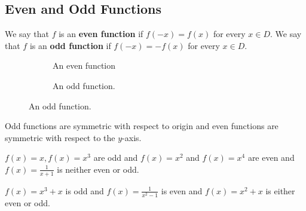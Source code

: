 \documentclass[../main.tex]{subfiles}
\begin{document}
\subsection*{Even and Odd Functions}

\begin{definition}
  We say that $f$ is an \textbf{even function} if $f\left( -x\right) =f\left( x\right) $ for every $x\in D$.
  We say that $f$ is an \textbf{odd function} if $f(-x)=-f(x)$ for every $x\in D$.
\end{definition}

\begin{figure}[H]
  \centering
  \begin{subfigure}{0.3\textwidth}
    
    \caption{An even function}
  \end{subfigure}
  \begin{subfigure}{0.3\textwidth}
    
    \caption{An odd function.}
  \end{subfigure}
\end{figure}

Odd functions are symmetric with respect to origin and even functions are symmetric with respect to the $y$-axis.


\begin{example}
  $f(x)=x,f(x)=x^{3}$ are odd and $f(x)=x^{2}$ and $f(x) =x^{4}$ are even and $f(x)=\frac{1}{x+1}$ is neither even or odd.
\end{example}

\begin{example}
  $f(x)=x^{3}+x$ is odd and $f(x)=\frac{1}{x^{2}-1}$ is even and $f(x)=x^{2}+x$
  is either even or odd.
\end{example}
\end{document}
